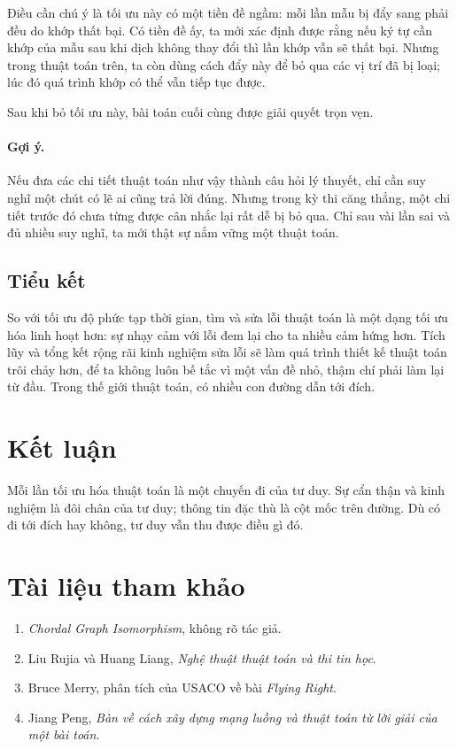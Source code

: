 \documentclass[11pt]{article}
\begin{document}
Điều cần chú ý là tối ưu này có một tiền đề ngầm: mỗi lần mẫu bị đẩy sang
phải đều do khớp thất bại. Có tiền đề ấy, ta mới xác định được rằng nếu ký tự
cần khớp của mẫu sau khi dịch không thay đổi thì lần khớp vẫn sẽ thất bại.
Nhưng trong thuật toán trên, ta còn dùng cách đẩy này để bỏ qua các vị trí đã
bị loại; lúc đó quá trình khớp có thể vẫn tiếp tục được.

Sau khi bỏ tối ưu này, bài toán cuối cùng được giải quyết trọn vẹn.

\paragraph{Gợi ý.}
Nếu đưa các chi tiết thuật toán như vậy thành câu hỏi lý thuyết, chỉ cần suy
nghĩ một chút có lẽ ai cũng trả lời đúng. Nhưng trong kỳ thi căng thẳng, một
chi tiết trước đó chưa từng được cân nhắc lại rất dễ bị bỏ qua. Chỉ sau vài
lần sai và đủ nhiều suy nghĩ, ta mới thật sự nắm vững một thuật toán.

\subsection{Tiểu kết}

So với tối ưu độ phức tạp thời gian, tìm và sửa lỗi thuật toán là một dạng tối
ưu hóa linh hoạt hơn: sự nhạy cảm với lỗi đem lại cho ta nhiều cảm hứng hơn.
Tích lũy và tổng kết rộng rãi kinh nghiệm sửa lỗi sẽ làm quá trình thiết kế
thuật toán trôi chảy hơn, để ta không luôn bế tắc vì một vấn đề nhỏ, thậm chí
phải làm lại từ đầu. Trong thế giới thuật toán, có nhiều con đường dẫn tới
đích.

\section{Kết luận}

Mỗi lần tối ưu hóa thuật toán là một chuyến đi của tư duy. Sự cẩn thận và
kinh nghiệm là đôi chân của tư duy; thông tin đặc thù là cột mốc trên đường.
Dù có đi tới đích hay không, tư duy vẫn thu được điều gì đó.

\section*{Tài liệu tham khảo}

\begin{enumerate}
  \item \textit{Chordal Graph Isomorphism}, không rõ tác giả.
  \item Liu Rujia và Huang Liang, \textit{Nghệ thuật thuật toán và thi tin học}.
  \item Bruce Merry, phân tích của USACO về bài \textit{Flying Right}.
  \item Jiang Peng, \textit{Bàn về cách xây dựng mạng luồng và thuật toán từ lời
  giải của một bài toán}.
\end{enumerate}
\end{document}
